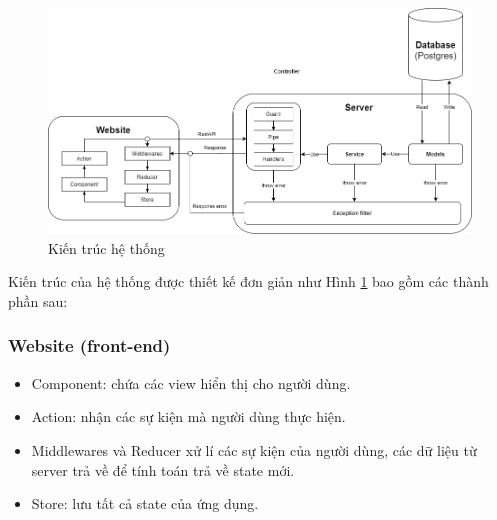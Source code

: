 \begin{figure}[h!]
    \begin{center}
        \includegraphics[width=14cm]{Image/Technical/architecture.png}
        \caption{Kiến trúc hệ thống}
        \label{architecture}
    \end{center}
\end{figure}

Kiến trúc của hệ thống được thiết kế đơn giản như Hình \ref{architecture} bao gồm các thành phần sau:
\subsubsection{Website (front-end)}
\begin{itemize}
    \item Component: chứa các view hiển thị cho người dùng.
    \item Action: nhận các sự kiện mà người dùng thực hiện.
    \item Middlewares và Reducer xử lí các sự kiện của người dùng, các dữ liệu từ server trả về để tính toán trả về state mới.
    \item Store: lưu tất cả state của ứng dụng.
\end{itemize}
